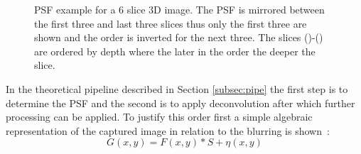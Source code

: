 \begin{figure}
    \centering
    \caption[PSF example for a 6 slice 3D image]{PSF example for a 6 slice 3D image. The PSF is mirrored between the first three and last three slices thus only the first three are shown and the order is inverted for the next three. The slices ()-() are ordered by depth where the later in the order the deeper the slice.}
    \label{fig:psf_example}
\end{figure}
\par In the theoretical pipeline described in Section \ref{subsec:pipe} the first step is to determine the PSF and the second is to apply deconvolution after which further processing can be applied. To justify this order first a simple algebraic representation of the captured image in relation to the blurring is shown~\cite{6505824, DeconLab2}:
\begin{equation}\label{eq:blurAdded}
    G(x,y) = F(x,y)*S + \eta(x,y)
\end{equation}
